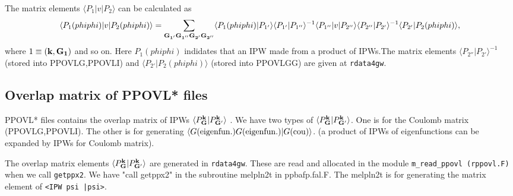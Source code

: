 \documentclass[a4paper,10pt,fleqn]{article}
\newcommand{\bfk}{{\bf k}}
\newcommand{\bfG}{{\bf G}}
\newcommand{\io}[1]{{\sf  #1}}
\newcommand{\req}[1]{\mbox{Eq.~(\ref{#1})}}
\begin{document}


The matrix elements $\langle P_1 |v| P_2 \rangle$ 
can be calculated as
\begin{eqnarray}
\langle P_1(phiphi) |v| P_2(phiphi) \rangle=
\sum_{\bf G_{1'} G_{1''} G_{2'} G_{2''}} 
\langle P_1(phiphi) | {P_{1'}} \rangle  
\langle {P}_{1'}| {P}_{1''} \rangle^{-1} 
\langle {P}_{1''} |v| {P_{2''}} \rangle  
\langle {P}_{2''}| {P}_{2'} \rangle^{-1} 
\langle {P_{2'}} | P_2(phiphi) \rangle,  
\label{eq:pvp}
\end{eqnarray}
where $1\equiv ({\bf k},{\bf G_1})$ and so on.
Here $P_1(phiphi)$ indidates 
that an IPW made from a product
of IPWs.The matrix elements
$\langle {P}_{2''}| {P}_{2'} \rangle^{-1}$ 
(stored into \io{PPOVLG,PPOVLI})
and $\langle {P_{2'}} | P_2(phiphi) \rangle$ 
(stored into \io{PPOVLGG})
are given at {\tt rdata4gw}.


\subsection{Overlap matrix of PPOVL* files}
\io{PPOVL*} files contains the 
overlap matrix of IPWs 
$\langle {P}^{\bf k}_{{\bf G}}|{P}^{\bf k}_{{\bf G'}}\rangle$
.
We have two types of $\langle {P}^{\bf k}_{{\bf G}}|{P}^{\bf k}_{{\bf G'}}\rangle$.
One is for the Coulomb matrix (PPOVLG,PPOVLI).
The other is for generating 
$\langle G({\rm eigenfun.}) G({\rm eigenfun.})| G({\rm cou}) \rangle$.  
(a product of IPWs of eigenfunctions can be
expanded by IPWs for Coulomb matrix).

The overlap matrix elements 
$\langle {P}^{\bf k}_{{\bf G}}|{P}^{\bf k}_{{\bf G'}}\rangle$ 
are generated in \verb!rdata4gw!.
These are read and allocated in the module 
\verb!m_read_ppovl (rppovl.F)! when we call 
\verb!getppx2!. We have "call getppx2" in the
subroutine melpln2t in ppbafp.fal.F.
The melpln2t is for generating the matrix element of
\verb!<IPW psi |psi>!.
\end{document}
